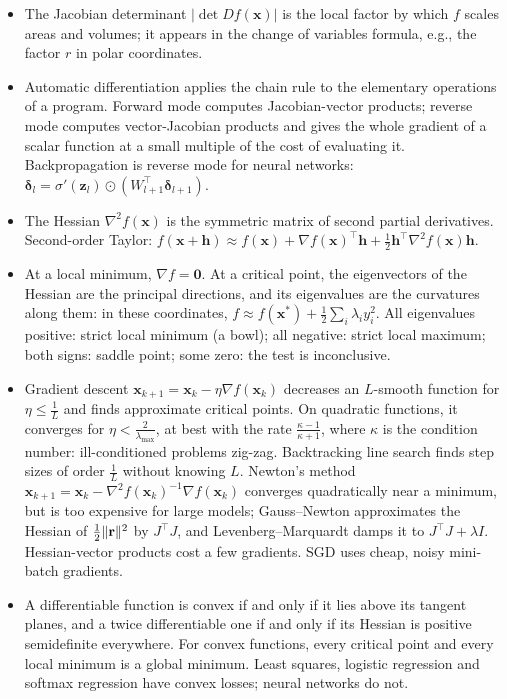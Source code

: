 \begin{itemize}[leftmargin=*]
    \item The Jacobian determinant $|\det Df(\mathbf{x})|$ is the local factor by which $f$ scales areas and volumes; it appears in the change of variables formula, e.g., the factor $r$ in polar coordinates.
    \item Automatic differentiation applies the chain rule to the elementary operations of a program. Forward mode computes Jacobian-vector products; reverse mode computes vector-Jacobian products and gives the whole gradient of a scalar function at a small multiple of the cost of evaluating it. Backpropagation is reverse mode for neural networks: $\boldsymbol{\delta}_l = \sigma'(\mathbf{z}_l) \odot (W_{l+1}^\top\boldsymbol{\delta}_{l+1})$.
    \item The Hessian $\nabla^2 f(\mathbf{x})$ is the symmetric matrix of second partial derivatives. Second-order Taylor: $f(\mathbf{x} + \mathbf{h}) \approx f(\mathbf{x}) + \nabla f(\mathbf{x})^\top\mathbf{h} + \frac{1}{2}\mathbf{h}^\top\nabla^2 f(\mathbf{x})\mathbf{h}$.
    \item At a local minimum, $\nabla f = \mathbf{0}$. At a critical point, the eigenvectors of the Hessian are the principal directions, and its eigenvalues are the curvatures along them: in these coordinates, $f \approx f(\mathbf{x}^*) + \frac{1}{2}\sum_i \lambda_i y_i^2$. All eigenvalues positive: strict local minimum (a bowl); all negative: strict local maximum; both signs: saddle point; some zero: the test is inconclusive.
    \item Gradient descent $\mathbf{x}_{k+1} = \mathbf{x}_k - \eta\nabla f(\mathbf{x}_k)$ decreases an $L$-smooth function for $\eta \leq \frac{1}{L}$ and finds approximate critical points. On quadratic functions, it converges for $\eta < \frac{2}{\lambda_{\max}}$, at best with the rate $\frac{\kappa - 1}{\kappa + 1}$, where $\kappa$ is the condition number: ill-conditioned problems zig-zag. Backtracking line search finds step sizes of order $\frac{1}{L}$ without knowing $L$. Newton's method $\mathbf{x}_{k+1} = \mathbf{x}_k - \nabla^2 f(\mathbf{x}_k)^{-1}\nabla f(\mathbf{x}_k)$ converges quadratically near a minimum, but is too expensive for large models; Gauss--Newton approximates the Hessian of $\frac{1}{2}\lVert \mathbf{r} \rVert^2$ by $J^\top J$, and Levenberg--Marquardt damps it to $J^\top J + \lambda I$. Hessian-vector products cost a few gradients. SGD uses cheap, noisy mini-batch gradients.
    \item A differentiable function is convex if and only if it lies above its tangent planes, and a twice differentiable one if and only if its Hessian is positive semidefinite everywhere. For convex functions, every critical point and every local minimum is a global minimum. Least squares, logistic regression and softmax regression have convex losses; neural networks do not.

\end{itemize}
